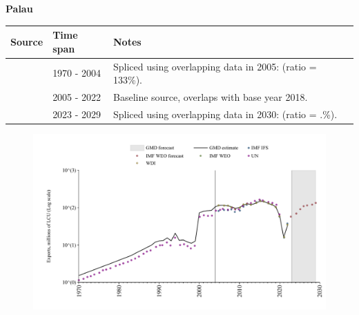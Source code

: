 \documentclass[12pt,a4paper,landscape]{article}
\begin{document}
\begin{adjustbox}{max totalsize={\paperwidth}{\paperheight},center}
\begin{minipage}[t][\textheight][t]{\textwidth}
\vspace*{0.5cm}
{}
\begin{center}
{\Large\bfseries Palau}
\end{center}
\vspace{0.5cm}
\begin{table}[H]
\centering
\small
\begin{tabular}{|l|l|l|}
\hline
\textbf{Source} & \textbf{Time span} & \textbf{Notes} \\
\hline
\rowcolor{white}\cite{UN}& 1970 - 2004 &Spliced using overlapping data in 2005: (ratio = 133\%).\\
\rowcolor{lightgray}\cite{WDI}& 2005 - 2022 &Baseline source, overlaps with base year 2018.\\
\rowcolor{white}\cite{IMF_WEO_forecast}& 2023 - 2029 &Spliced using overlapping data in 2030: (ratio = .\%).\\
\hline
\end{tabular}
\end{table}
\begin{figure}[H]
\centering
\includegraphics[width=\textwidth,height=0.6\textheight,keepaspectratio]{graphs/PLW_exports.pdf}
\end{figure}
\end{minipage}
\end{adjustbox}
\end{document}
